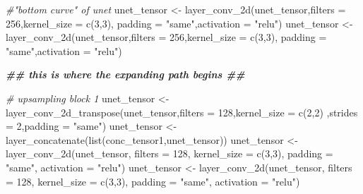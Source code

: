 \documentclass[
]{article}
\newenvironment{Shaded}{\begin{snugshade}}{\end{snugshade}}
\newcommand{\AttributeTok}[1]{\textcolor[rgb]{0.77,0.63,0.00}{#1}}
\newcommand{\CommentTok}[1]{\textcolor[rgb]{0.56,0.35,0.01}{\textit{#1}}}
\newcommand{\DecValTok}[1]{\textcolor[rgb]{0.00,0.00,0.81}{#1}}
\newcommand{\DocumentationTok}[1]{\textcolor[rgb]{0.56,0.35,0.01}{\textbf{\textit{#1}}}}
\newcommand{\FunctionTok}[1]{\textcolor[rgb]{0.00,0.00,0.00}{#1}}
\newcommand{\NormalTok}[1]{#1}
\newcommand{\OtherTok}[1]{\textcolor[rgb]{0.56,0.35,0.01}{#1}}
\newcommand{\StringTok}[1]{\textcolor[rgb]{0.31,0.60,0.02}{#1}}
\begin{document}
\begin{Shaded}
\begin{Highlighting}[]
  \CommentTok{\#"bottom curve" of unet}
\NormalTok{  unet\_tensor }\OtherTok{\textless{}{-}} \FunctionTok{layer\_conv\_2d}\NormalTok{(unet\_tensor,}\AttributeTok{filters =} \DecValTok{256}\NormalTok{,}\AttributeTok{kernel\_size =} \FunctionTok{c}\NormalTok{(}\DecValTok{3}\NormalTok{,}\DecValTok{3}\NormalTok{), }
                               \AttributeTok{padding =} \StringTok{"same"}\NormalTok{,}\AttributeTok{activation =} \StringTok{"relu"}\NormalTok{)}
\NormalTok{  unet\_tensor }\OtherTok{\textless{}{-}} \FunctionTok{layer\_conv\_2d}\NormalTok{(unet\_tensor,}\AttributeTok{filters =} \DecValTok{256}\NormalTok{,}\AttributeTok{kernel\_size =} \FunctionTok{c}\NormalTok{(}\DecValTok{3}\NormalTok{,}\DecValTok{3}\NormalTok{), }
                               \AttributeTok{padding =} \StringTok{"same"}\NormalTok{,}\AttributeTok{activation =} \StringTok{"relu"}\NormalTok{)}
  
  \DocumentationTok{\#\#  this is where the expanding path begins \#\#}
  
  \CommentTok{\# upsampling block 1}
\NormalTok{  unet\_tensor }\OtherTok{\textless{}{-}} \FunctionTok{layer\_conv\_2d\_transpose}\NormalTok{(unet\_tensor,}\AttributeTok{filters =} \DecValTok{128}\NormalTok{,}\AttributeTok{kernel\_size =} \FunctionTok{c}\NormalTok{(}\DecValTok{2}\NormalTok{,}\DecValTok{2}\NormalTok{)}
\NormalTok{                                         ,}\AttributeTok{strides =} \DecValTok{2}\NormalTok{,}\AttributeTok{padding =} \StringTok{"same"}\NormalTok{)}
\NormalTok{  unet\_tensor }\OtherTok{\textless{}{-}} \FunctionTok{layer\_concatenate}\NormalTok{(}\FunctionTok{list}\NormalTok{(conc\_tensor1,unet\_tensor))}
\NormalTok{  unet\_tensor }\OtherTok{\textless{}{-}} \FunctionTok{layer\_conv\_2d}\NormalTok{(unet\_tensor, }\AttributeTok{filters =} \DecValTok{128}\NormalTok{, }\AttributeTok{kernel\_size =} \FunctionTok{c}\NormalTok{(}\DecValTok{3}\NormalTok{,}\DecValTok{3}\NormalTok{),}
                               \AttributeTok{padding =} \StringTok{"same"}\NormalTok{, }\AttributeTok{activation =} \StringTok{"relu"}\NormalTok{)}
\NormalTok{  unet\_tensor }\OtherTok{\textless{}{-}} \FunctionTok{layer\_conv\_2d}\NormalTok{(unet\_tensor, }\AttributeTok{filters =} \DecValTok{128}\NormalTok{, }\AttributeTok{kernel\_size =} \FunctionTok{c}\NormalTok{(}\DecValTok{3}\NormalTok{,}\DecValTok{3}\NormalTok{),}
                               \AttributeTok{padding =} \StringTok{"same"}\NormalTok{, }\AttributeTok{activation =} \StringTok{"relu"}\NormalTok{)}
  

\end{Highlighting}
\end{Shaded}
\end{document}
